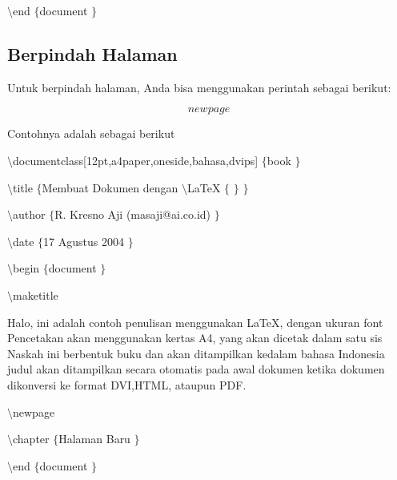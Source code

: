 {\fontsize{10pt}{10pt}\selectfont  $  \setminus  $end $  \{  $document $  \}  $}
 \par

\subsection{Berpindah Halaman}
 \par
Untuk berpindah halaman, Anda bisa menggunakan perintah sebagai berikut: \par
\begin{equation}
newpage
\end{equation}

\vspace{9pt}
Contohnya adalah sebagai berikut \par
{\fontsize{10pt}{10pt}\selectfont  $  \setminus  $documentclass[12pt,a4paper,oneside,bahasa,dvips] $  \{  $book $  \}  $} \par
{\fontsize{10pt}{10pt}\selectfont  $  \setminus  $title $  \{  $Membuat Dokumen dengan  $  \setminus  $LaTeX $  \{  $ $  \}  $ $  \}  $} \par
{\fontsize{10pt}{10pt}\selectfont  $  \setminus  $author $  \{  $R. Kresno Aji (masaji@ai.co.id) $  \}  $} \par
{\fontsize{10pt}{10pt}\selectfont  $  \setminus  $date $  \{  $17 Agustus 2004 $  \}  $} \par
{\fontsize{10pt}{10pt}\selectfont  $  \setminus  $begin $  \{  $document $  \}  $} \par
{\fontsize{10pt}{10pt}\selectfont  $  \setminus  $maketitle} \par
\vspace{10pt}
{\fontsize{10pt}{10pt}\selectfont Halo, ini adalah contoh penulisan menggunakan LaTeX, dengan ukuran font Pencetakan akan menggunakan kertas A4, yang akan dicetak dalam satu sis Naskah ini berbentuk buku dan akan ditampilkan kedalam bahasa Indonesia judul akan ditampilkan secara otomatis pada awal dokumen ketika dokumen dikonversi ke format DVI,HTML, ataupun PDF.} \par
\vspace{10pt}
{\fontsize{10pt}{10pt}\selectfont  $  \setminus  $newpage} \par
{\fontsize{10pt}{10pt}\selectfont  $  \setminus  $chapter $  \{  $Halaman Baru $  \}  $} \par
{\fontsize{10pt}{10pt}\selectfont  $  \setminus  $end $  \{  $document $  \}  $} \par

